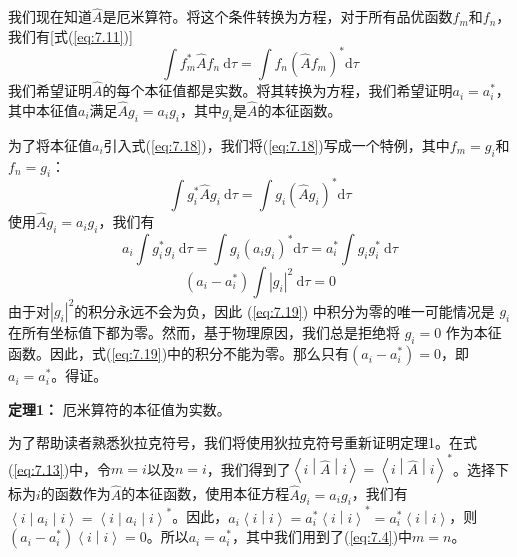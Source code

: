     我们现在知道$\hat{A}$是厄米算符。将这个条件转换为方程，对于所有品优函数$f_m$和$f_n$，我们有[式(\ref{eq:7.11})]
    \begin{equation}
        \int f^{\ast}_m \hat{A} f_n \:\mathrm{d}\tau = \int f_n \left(\hat{A} f_m\right)^{\ast} \mathrm{d}\tau
        \label{eq:7.18}
    \end{equation}
    我们希望证明$\hat{A}$的每个本征值都是实数。将其转换为方程，我们希望证明$a_i = a_i^{\ast}$，其中本征值$a_i$满足$\hat{A}g_i = a_i g_i$，其中$g_i$是$\hat{A}$的本征函数。

    为了将本征值$a_i$引入式(\ref{eq:7.18})，我们将(\ref{eq:7.18})写成一个特例，其中$f_m = g_i$和$f_n = g_i$：
    \begin{equation*}
        \int g_i^{\ast} \hat{A} g_i \:\mathrm{d}\tau = \int g_i \left(\hat{A} g_i\right)^{\ast} \mathrm{d}\tau
    \end{equation*}
    使用$\hat{A} g_i = a_i g_i$，我们有
    \begin{equation*}
        a_i \int g_i^{\ast} g_i \:\mathrm{d}\tau = \int g_i \left(a_i g_i\right)^{\ast} \mathrm{d}\tau = a_i^{\ast} \int g_i g_i^{\ast} \:\mathrm{d}\tau
    \end{equation*}
    \begin{equation}
        \left(a_i - a_i^{\ast}\right) \int \left|g_i\right|^2 \:\mathrm{d}\tau = 0
        \label{eq:7.19}
    \end{equation}
    由于对$\left|g_i\right|^2$的积分永远不会为负，因此 (\ref{eq:7.19}) 中积分为零的唯一可能情况是 $g_i$ 在所有坐标值下都为零。然而，基于物理原因，我们总是拒绝将 $g_i=0$ 作为本征函数。因此，式(\ref{eq:7.19})中的积分不能为零。那么只有$\left(a_i - a_i^{\ast}\right) = 0$，即$a_i = a_i^{\ast}$。得证。

    \begin{center}
        \parbox{0.8\textwidth}{
            \textbf{定理1：} 厄米算符的本征值为实数。
        }
    \end{center}

    为了帮助读者熟悉狄拉克符号，我们将使用狄拉克符号重新证明定理1。在式(\ref{eq:7.13})中，令$m=i$以及$n=i$，我们得到了$\left\langle i \middle| \hat{A} \middle| i \right\rangle = \left\langle i \middle| \hat{A} \middle| i \right\rangle^{\ast}$。选择下标为$i$的函数作为$\hat{A}$的本征函数，使用本征方程$\hat{A} g_i = a_i g_i$，我们有$\left\langle i \middle| a_i \middle| i \right\rangle = \left\langle i \middle| a_i \middle| i \right\rangle^{\ast}$。因此，$a_i \left\langle i \middle| i \right\rangle = a_i^{\ast} \left\langle i \middle| i \right\rangle^{\ast} = a_i^{\ast}\left\langle i \middle| i \right\rangle$，则$\left(a_i - a_i^{\ast}\right)\left\langle i \middle| i \right\rangle = 0$。所以$a_i = a_i^{\ast}$，其中我们用到了(\ref{eq:7.4})中$m=n$。

